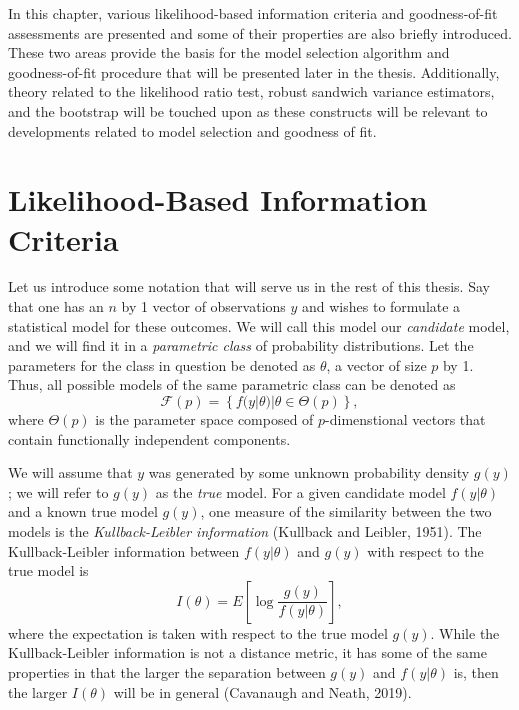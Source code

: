 \doublespace
{}
		In this chapter, various likelihood-based information criteria and goodness-of-fit assessments are presented and some of their properties are also briefly introduced.
		These two areas provide the basis for the model selection algorithm and goodness-of-fit procedure that will be presented later in the thesis. Additionally, theory
		related to the likelihood ratio test, robust sandwich variance estimators, and the bootstrap will be touched upon as these constructs will be relevant to developments
		related to model selection and goodness of fit.
		
		\section{Likelihood-Based Information Criteria}

		Let us introduce some notation that will serve us in the rest of this thesis. Say that one has an $n$ by 1  vector of observations $y$ and wishes to formulate a
		statistical model for these outcomes. We will call this model our \textit{candidate} model, and we will find it in a \textit{parametric class} of probability distributions.
		Let the parameters for the class in question be denoted as $\theta$, a vector of size $p$ by 1. Thus, all possible models of the same parametric class can be denoted
		as
		\begin{equation}
			\mathcal{F}(p) = \left\{ f(y|\theta) | \theta \in \Theta(p) \right\} ,
		\end{equation}
		where $\Theta(p)$ is the parameter space composed of $p$-dimenstional vectors that contain functionally independent components.

		We will assume that $y$ was generated by some unknown probability density $g(y)$; we will refer to $g(y)$ as the \textit{true} model. For a given candidate model $f(y|\theta)$
		and a known true model $g(y)$, one measure of the similarity between the two models is the \textit{Kullback-Leibler information} (Kullback and Leibler, 1951). The Kullback-Leibler
		information between $f(y|\theta)$ and $g(y)$ with respect to the true model is
		\begin{equation}
			I(\theta) = E \left[ \log \frac{g(y)}{f(y|\theta)} \right],
		\end{equation}
		where the expectation is taken with respect to the true model $g(y)$. While the Kullback-Leibler information is not a distance metric, it has some of the same properties in
		that the larger the separation between $g(y)$ and $f(y|\theta)$ is, then the larger $I(\theta)$ will be in general (Cavanaugh and Neath, 2019).
		
